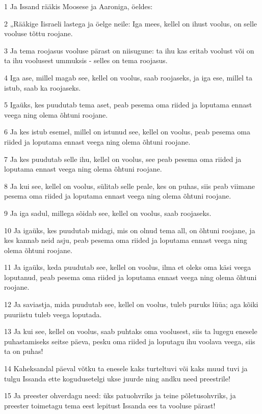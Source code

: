 \par 1 Ja Issand rääkis Moosese ja Aaroniga, öeldes:
\par 2 „Rääkige Iisraeli lastega ja öelge neile: Iga mees, kellel on ihust voolus, on selle vooluse tõttu roojane.
\par 3 Ja tema roojasus vooluse pärast on niisugune: ta ihu kas eritab voolust või on ta ihu voolusest ummuksis - selles on tema roojasus.
\par 4 Iga ase, millel magab see, kellel on voolus, saab roojaseks, ja iga ese, millel ta istub, saab ka roojaseks.
\par 5 Igaüks, kes puudutab tema aset, peab pesema oma riided ja loputama ennast veega ning olema õhtuni roojane.
\par 6 Ja kes istub esemel, millel on istunud see, kellel on voolus, peab pesema oma riided ja loputama ennast veega ning olema õhtuni roojane.
\par 7 Ja kes puudutab selle ihu, kellel on voolus, see peab pesema oma riided ja loputama ennast veega ning olema õhtuni roojane.
\par 8 Ja kui see, kellel on voolus, sülitab selle peale, kes on puhas, siis peab viimane pesema oma riided ja loputama ennast veega ning olema õhtuni roojane.
\par 9 Ja iga sadul, millega sõidab see, kellel on voolus, saab roojaseks.
\par 10 Ja igaüks, kes puudutab midagi, mis on olnud tema all, on õhtuni roojane, ja kes kannab neid asju, peab pesema oma riided ja loputama ennast veega ning olema õhtuni roojane.
\par 11 Ja igaüks, keda puudutab see, kellel on voolus, ilma et oleks oma käsi veega loputanud, peab pesema oma riided ja loputama ennast veega ning olema õhtuni roojane.
\par 12 Ja saviastja, mida puudutab see, kellel on voolus, tuleb puruks lüüa; aga kõiki puuriistu tuleb veega loputada.
\par 13 Ja kui see, kellel on voolus, saab puhtaks oma voolusest, siis ta lugegu enesele puhastamiseks seitse päeva, pesku oma riided ja loputagu ihu voolava veega, siis ta on puhas!
\par 14 Kaheksandal päeval võtku ta enesele kaks turteltuvi või kaks muud tuvi ja tulgu Issanda ette kogudusetelgi ukse juurde ning andku need preestrile!
\par 15 Ja preester ohverdagu need: üks patuohvriks ja teine põletusohvriks, ja preester toimetagu tema eest lepitust Issanda ees ta vooluse pärast!
